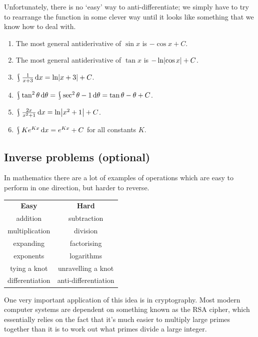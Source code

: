 Unfortunately, there is no `easy' way to anti-differentiate; we simply have to try to rearrange the function in some clever
way until it looks like something that we know how to deal with.

\begin{exs}\leavevmode
  \begin{enumerate}
    \item The most general antiderivative of $ \sin x $ is $ -\cos x + C $.
    \item The most general antiderivative of $ \tan x $ is $ -\ln \abs{\cos x} + C $.
    \item $ \rint \frac{1}{x + 3} \dif{x} = \ln \abs{x + 3} + C $.
    \item $ \rint \tan^2 \theta \dif{\theta} = \rint \sec^2 \theta - 1 \dif{\theta} = \tan \theta - \theta + C $.
    \item $ \rint \frac{2x}{x^2 + 1} \dif{x} = \ln \abs{x^2 + 1} + C $.
    \item $ \rint Ke^{Kx} \dif{x} = e^{Kx} + C $ for all constants $ K $.
  \end{enumerate}
\end{exs}

\subsection{Inverse problems (optional)}
In mathematics there are a lot of examples of operations which are easy to perform
in one direction, but harder to reverse.

\begin{center}
  \begin{tabular}{c|c}
    \textbf{Easy} & \textbf{Hard}\\
    addition & subtraction\\
    multiplication & division\\
    expanding & factorising\\
    exponents & logarithms\\
    tying a knot & unravelling a knot\\
    differentiation & anti-differentiation
  \end{tabular}
\end{center}

One very important application of this idea is in cryptography. Most modern computer
systems are dependent on something known as the RSA cipher, which essentially relies
on the fact that it's much easier to multiply large primes together than it is to
work out what primes divide a large integer.

